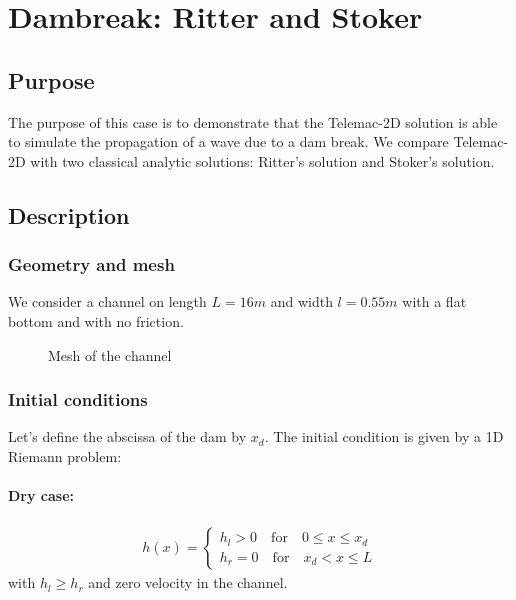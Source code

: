 \chapter{Dambreak: Ritter and Stoker}
%
%
\section{Purpose}
%
The purpose of this case is to demonstrate that the Telemac-2D solution is able to simulate the propagation of a wave due to a dam break. We compare Telemac-2D with two classical analytic solutions: Ritter's solution and Stoker's solution.

%
\section{Description}
%
\subsection{Geometry and mesh}

We consider a channel on length $L=16m$ and width $l=0.55m$ with a flat bottom and with no friction.

\begin{figure}[H]
   \centering
 \caption{Mesh of the channel} \label{fig:rittermesh}
 \end{figure}

\subsection{Initial conditions}

Let's define the abscissa of the dam by $x_d$. The initial condition is given by a 1D Riemann problem:

\subsubsection{Dry case:}

\begin{equation}
\begin{split}h(x) = \begin{cases}
h_l > 0 \quad \text{for} \quad 0 \leq x \leq x_d \\
h_r = 0 \quad \text{for} \quad x_d < x \leq L
\end{cases}\end{split}
\end{equation}
with $h_l \geq h_r$ and zero velocity in the channel.

